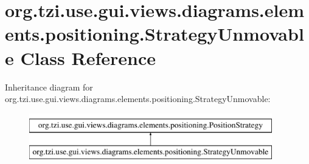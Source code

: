 \hypertarget{classorg_1_1tzi_1_1use_1_1gui_1_1views_1_1diagrams_1_1elements_1_1positioning_1_1_strategy_unmovable}{\section{org.\-tzi.\-use.\-gui.\-views.\-diagrams.\-elements.\-positioning.\-Strategy\-Unmovable Class Reference}
\label{classorg_1_1tzi_1_1use_1_1gui_1_1views_1_1diagrams_1_1elements_1_1positioning_1_1_strategy_unmovable}
}
Inheritance diagram for org.\-tzi.\-use.\-gui.\-views.\-diagrams.\-elements.\-positioning.\-Strategy\-Unmovable\-:\begin{figure}[H]
\begin{center}
\leavevmode
\includegraphics[height=2.000000cm]{classorg_1_1tzi_1_1use_1_1gui_1_1views_1_1diagrams_1_1elements_1_1positioning_1_1_strategy_unmovable}
\end{center}
\end{figure}
